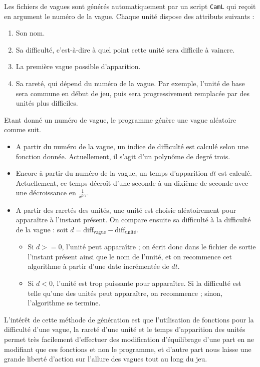\documentclass[a4paper,11pt]{article}
\begin{document}
Les fichiers de vagues sont générés automatiquement par un script \texttt{CamL} qui reçoit en argument le numéro de la vague. Chaque unité dispose des attributs suivants :

\begin{enumerate}
\item Son nom.
\item Sa difficulté, c'est-à-dire à quel point cette unité sera difficile à vaincre.
\item La première vague possible d'apparition.
\item Sa rareté, qui dépend du numéro de la vague. Par exemple, l'unité de base sera commune en début de jeu, puis sera progressivement remplacée par des unités plus difficiles.
\end{enumerate}

Etant donné un numéro de vague, le programme génère une vague aléatoire comme suit.

\begin{itemize}
\item A partir du numéro de la vague, un indice de difficulté est calculé selon une fonction donnée. Actuellement, il s'agit d'un polynôme de degré trois.
\item Encore à partir du numéro de la vague, un temps d'apparition $dt$ est calculé. Actuellement, ce temps décroît d'une seconde à un dixième de seconde avec une décroissance en $\frac{1}{x^{0.7}}$.
\item A partir des raretés des unités, une unité est choisie aléatoirement pour apparaître à l'instant présent. On compare ensuite sa difficulté à la difficulté de la vague : soit $d = \text{diff}_{\text{vague}} - \text{diff}_{\text{unité}}$.
  \begin{itemize}
  \item Si $d >= 0$, l'unité peut apparaître ; on écrit donc dans le fichier de sortie l'instant présent ainsi que le nom de l'unité, et on recommence cet algorithme à partir d'une date incrémentée de $dt$.
  \item Si $d < 0$, l'unité est trop puissante pour apparaître. Si la difficulté est telle qu'une des unités peut apparaître, on recommence ; sinon, l'algorithme se termine.
  \end{itemize}
\end{itemize}

L'intérêt de cette méthode de génération est que l'utilisation de fonctions pour la difficulté d'une vague, la rareté d'une unité et le temps d'apparition des unités permet très facilement d'effectuer des modification d'équilibrage d'une part en ne modifiant que ces fonctions et non le programme, et d'autre part nous laisse une grande liberté d'action sur l'allure des vagues tout au long du jeu.
\end{document}
